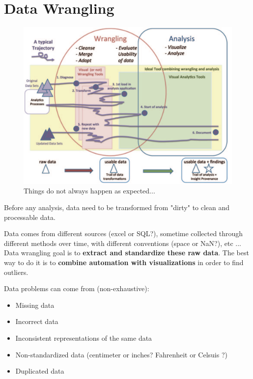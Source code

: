 
\section{Data Wrangling}

\begin{figure}[H]%
 \centering
 \includegraphics[width=12cm]{./img/03/path_data_wrangling}
 \caption{\label{path_data_wrangling}Things do not always happen as expected...}
\end{figure}

Before any analysis, data need to be transformed from "dirty" to clean and processable data. 

Data comes from different sources (excel or SQL?), sometime collected through different methods over time, with different conventions (space or NaN?), etc ... Data wrangling goal is to \textbf{extract and standardize these raw data}. The best way to do it is to \textbf{combine automation with visualizations} in order to find outliers. 

Data problems can come from (non-exhaustive): 
\begin{itemize}
  \item Missing data
  \item Incorrect data
  \item Inconsistent representations of the same data
  \item Non-standardized data (centimeter or inches? Fahrenheit or Celsuis ?)
  \item Duplicated data
\end{itemize}

